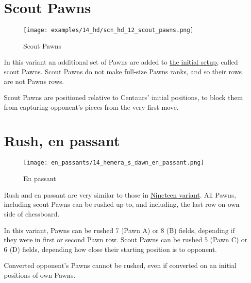 \section*{Scout Pawns}

\vspace*{-1.3\baselineskip}
\noindent
\begin{figure}[!h]
\texttt{[image: examples/14\_hd/scn\_hd\_12\_scout\_pawns.png]}
\caption{Scout Pawns}
\label{fig:scn_hd_12_scout_pawns}
\end{figure}

In this variant an additional set of Pawns are added to \hyperref[fig:14_hemera_s_dawn]{the initial setup},
called scout Pawns. Scout Pawns do not make full-size Pawns ranks, and so their rows are not Pawns rows.

Scout Pawns are positioned relative to Centaurs' initial positions, to block them from capturing opponent's
pieces from the very first move.

\clearpage %

\section*{Rush, en passant}

\vspace*{-1.2\baselineskip}
\noindent
\begin{figure}[!h]
\texttt{[image: en\_passants/14\_hemera\_s\_dawn\_en\_passant.png]}
\caption{En passant}
\label{fig:14_hemera_s_dawn_en_passant}
\end{figure}

Rush and en passant are very similar to those in \hyperref[fig:12_nineteen_en_passant]{Nineteen variant}.
All Pawns, including scout Pawns can be rushed up to, and including, the last row on own side of
chessboard.

In this variant, Pawns can be rushed 7 (Pawn A) or 8 (B) fields, depending if they were in first or second
Pawn row. Scout Pawns can be rushed 5 (Pawn C) or 6 (D) fields, depending how close their starting position
is to opponent.

Converted opponent's Pawns cannot be rushed, even if converted on an initial positions
of own Pawns.

